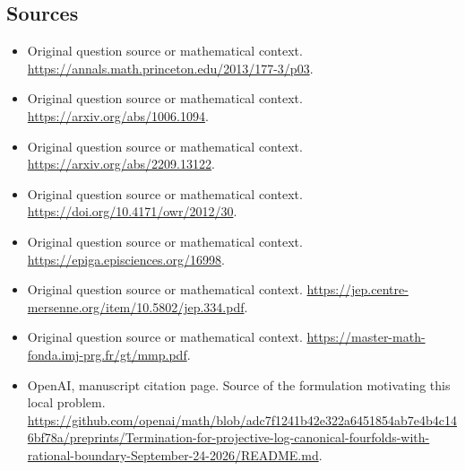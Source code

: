 \documentclass[11pt]{article}
\begin{document}
\subsection{Sources}
\begin{itemize}
\item[S1] Original question source or mathematical context.
\url{https://annals.math.princeton.edu/2013/177-3/p03}.
\item[S2] Original question source or mathematical context.
\url{https://arxiv.org/abs/1006.1094}.
\item[S3] Original question source or mathematical context.
\url{https://arxiv.org/abs/2209.13122}.
\item[S4] Original question source or mathematical context.
\url{https://doi.org/10.4171/owr/2012/30}.
\item[S5] Original question source or mathematical context.
\url{https://epiga.episciences.org/16998}.
\item[S6] Original question source or mathematical context.
\url{https://jep.centre-mersenne.org/item/10.5802/jep.334.pdf}.
\item[S7] Original question source or mathematical context.
\url{https://master-math-fonda.imj-prg.fr/gt/mmp.pdf}.
\item[S8] OpenAI, manuscript citation page. Source of the formulation motivating this local problem.
\url{https://github.com/openai/math/blob/adc7f1241b42e322a6451854ab7e4b4c146bf78a/preprints/Termination-for-projective-log-canonical-fourfolds-with-rational-boundary-September-24-2026/README.md}.
\end{itemize}
\end{document}
